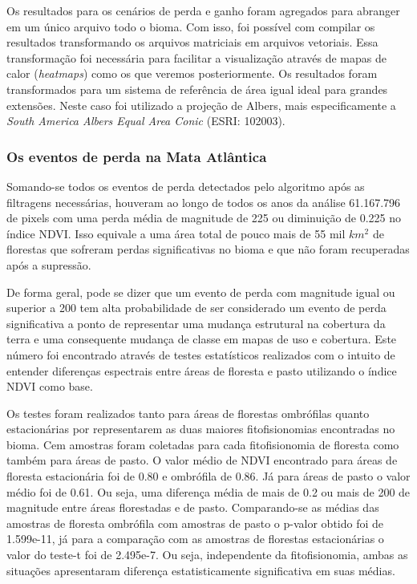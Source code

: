 \hspace{13pt} Os resultados para os cenários de perda e ganho foram agregados para abranger em um único arquivo todo o bioma. Com isso, foi possível com compilar os resultados transformando os arquivos matriciais em arquivos vetoriais. Essa transformação foi necessária para facilitar a visualização através de mapas de calor (\textit{heatmaps}) como os que veremos posteriormente. Os resultados foram transformados para um sistema de referência de área igual ideal para grandes extensões. Neste caso foi utilizado a projeção de Albers, mais especificamente a \textit{South America Albers Equal Area Conic} (ESRI: 102003). 

\subsubsection{Os eventos de perda na Mata Atlântica}

\hspace{13pt} Somando-se todos os eventos de perda detectados pelo algoritmo após as filtragens necessárias, houveram ao longo de todos os anos da análise 61.167.796 de pixels com uma perda média de magnitude de 225 ou diminuição de 0.225 no índice NDVI. Isso equivale a uma área total de pouco mais de 55 mil $ km^2 $ de florestas que sofreram perdas significativas no bioma e que não foram recuperadas após a supressão.

De forma geral, pode se dizer que um evento de perda com magnitude igual ou superior a 200 tem alta probabilidade de ser considerado um evento de perda significativa a ponto de representar uma mudança estrutural na cobertura da terra e uma consequente mudança de classe em mapas de uso e cobertura. Este número foi encontrado através de testes estatísticos realizados com o intuito de entender diferenças espectrais entre áreas de floresta e pasto utilizando o índice NDVI como base. 

Os testes foram realizados tanto para áreas de florestas ombrófilas quanto estacionárias por representarem as duas maiores fitofisionomias encontradas no bioma. Cem amostras foram coletadas para cada fitofisionomia de floresta como também para áreas de pasto. O valor médio de NDVI encontrado para áreas de floresta estacionária foi de 0.80 e ombrófila de 0.86. Já para áreas de pasto o valor médio foi de 0.61. Ou seja, uma diferença média de mais de 0.2 ou mais de 200 de magnitude entre áreas florestadas e de pasto. Comparando-se as médias das amostras de floresta ombrófila com amostras de pasto o p-valor obtido foi de 1.599e-11, já para a comparação com as amostras de florestas estacionárias o valor do teste-t foi de 2.495e-7. Ou seja, independente da fitofisionomia, ambas as situações apresentaram diferença estatisticamente significativa em suas médias.

